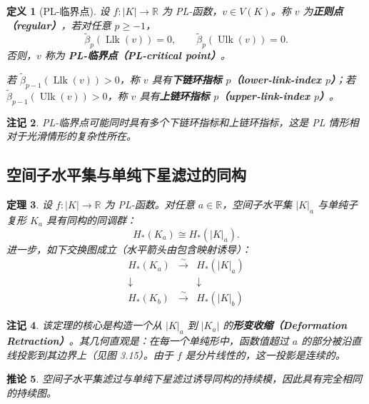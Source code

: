 \documentclass[UTF8]{ctexart}
\newtheorem{definition}{定义}[section]
\newtheorem{remark}[definition]{注记}
\newtheorem{theorem}[definition]{定理}
\newtheorem{corollary}[definition]{推论}
\begin{document}
\begin{definition}[PL-临界点]
\label{def:pl-critical}
设 \(f: |K| \to \mathbb{R}\) 为 PL-函数，\(v \in V(K)\)。称 \(v\) 为\textbf{正则点（regular）}，若对任意 \(p \ge -1\)，
\[
\tilde{\beta}_p(\operatorname{Llk}(v)) = 0, \qquad \tilde{\beta}_p(\operatorname{Ulk}(v)) = 0.
\]
否则，\(v\) 称为 \textbf{PL-临界点（PL-critical point）}。

若 \(\tilde{\beta}_{p-1}(\operatorname{Llk}(v)) > 0\)，称 \(v\) 具有\textbf{下链环指标 \(p\)（lower-link-index \(p\)）}；若 \(\tilde{\beta}_{p-1}(\operatorname{Ulk}(v)) > 0\)，称 \(v\) 具有\textbf{上链环指标 \(p\)（upper-link-index \(p\)）}。
\end{definition}

\begin{remark}
PL-临界点可能同时具有多个下链环指标和上链环指标，这是 PL 情形相对于光滑情形的复杂性所在。
\end{remark}

\subsection{空间子水平集与单纯下星滤过的同构}
\label{subsec:pl-sublevel-isomorphism}

\begin{theorem}
\label{thm:pl-sublevel-isomorphism}
设 \(f: |K| \to \mathbb{R}\) 为 PL-函数。对任意 \(a \in \mathbb{R}\)，空间子水平集 \(|K|_a\) 与单纯子复形 \(K_a\) 具有同构的同调群：
\[
H_*(K_a) \cong H_*(|K|_a).
\]
进一步，如下交换图成立（水平箭头由包含映射诱导）：
\[
\begin{array}{ccc}
H_*(K_a) & \xrightarrow{\sim} & H_*(|K|_a) \\
\downarrow & & \downarrow \\
H_*(K_b) & \xrightarrow{\sim} & H_*(|K|_b)
\end{array}
\]
\end{theorem}

\begin{remark}
该定理的核心是构造一个从 \(|K|_a\) 到 \(|K_a|\) 的\textbf{形变收缩（Deformation Retraction）}。其几何直观是：在每一个单纯形中，函数值超过 \(a\) 的部分被沿直线投影到其边界上（见图 3.15）。由于 \(f\) 是分片线性的，这一投影是连续的。
\end{remark}

\begin{corollary}
\label{cor:pl-isomorphic-persistence}
空间子水平集滤过与单纯下星滤过诱导同构的持续模，因此具有完全相同的持续图。
\end{corollary}
\end{document}
